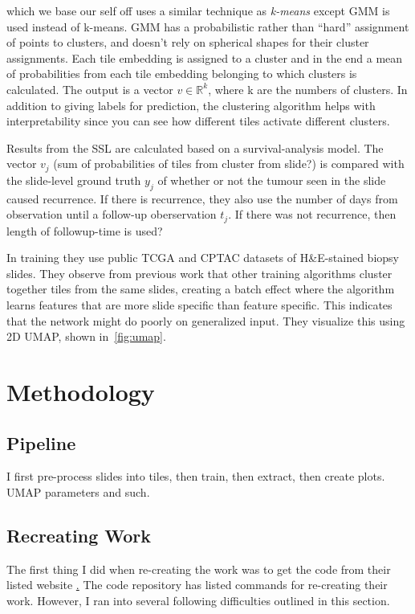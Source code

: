 \documentclass[10pt,twocolumn,letterpaper]{article}
\begin{document}
\cite{sslUMAP} which we base our self off uses a similar technique as \textit{k-means} except \gls{GMM} is used instead of k-means. \gls{GMM} has a probabilistic rather than ``hard'' assignment of points to clusters, and doesn't rely on spherical shapes for their cluster assignments. Each tile embedding is assigned to a cluster and in the end a mean of probabilities from each tile embedding belonging to which clusters is calculated. The output is a vector $v \in \mathbb{R}^{k}$, where k are the numbers of clusters. 
In addition to giving labels for prediction, the clustering algorithm helps with interpretability since you can see how different tiles activate different clusters.

Results from the \gls{SSL} are calculated based on a survival-analysis model. The vector $v_{j}$ (sum of probabilities of tiles from cluster from slide?) is compared with the slide-level ground truth $y_{j}$ of whether or not the tumour seen in the slide caused recurrence. If there is recurrence, they also use the number of days from observation until a follow-up oberservation $t_{j}$. If there was not recurrence, then length of followup-time is used? %


In training they use public TCGA and CPTAC datasets of H\&E-stained biopsy slides. They observe from previous work that other training algorithms cluster together tiles from the same slides, creating a batch effect where the algorithm learns features that are more slide specific than feature specific. This indicates that the network might do poorly on generalized input. They visualize this using 2D \gls{UMAP}, shown in~\cref{fig:umap}.


\section{Methodology}\label{sec:methodology}
\subsection{Pipeline}
I first pre-process slides into tiles, then train, then extract, then create plots. UMAP parameters and such.

\subsection{Recreating Work}
The first thing I did when re-creating the work was to get the code from their listed website \href{https://github.com/NYUMedML/conditional_ssl_hist}. The code repository has listed commands for re-creating their work. However, I ran into several following difficulties outlined in this section.
\end{document}
